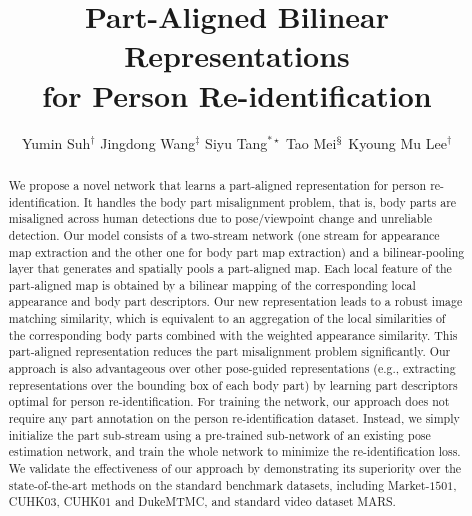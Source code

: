 \documentclass{llncs}
\begin{document}
\pagestyle{headings}
\mainmatter
\def\ECCV18SubNumber{****}  

\title{Part-Aligned Bilinear Representations \\for Person Re-identification}

\author{Yumin Suh$^\dagger$ \quad Jingdong Wang$^\ddagger$ \quad Siyu Tang$^{\ast \star}$ \quad Tao Mei$^\mathsection$ \quad Kyoung Mu Lee$^\dagger$}

\maketitle

\begin{abstract}
We propose a novel network that learns a part-aligned representation for person re-identification. It handles the body part misalignment problem, that is, body parts are misaligned across human detections due to pose/viewpoint change and unreliable detection. Our model consists of a two-stream network (one stream for appearance map extraction and the other one for body part map extraction) and a bilinear-pooling layer that generates and spatially pools a part-aligned map. Each local feature of the part-aligned map is obtained by a bilinear mapping of the corresponding local appearance and body part descriptors. Our new representation leads to a robust image matching similarity, which is equivalent to an aggregation of the local similarities of the corresponding body parts combined with the weighted appearance similarity. This part-aligned representation reduces the part misalignment problem significantly. Our approach is also advantageous over other pose-guided representations (e.g., extracting representations over the bounding box of each body part) by learning part descriptors optimal for person re-identification. For training the network, our approach does not require any part annotation on the person re-identification dataset. Instead, we simply initialize the part sub-stream using a pre-trained sub-network of an existing pose estimation network, and train the whole network to minimize the re-identification loss. We validate the effectiveness of our approach by demonstrating its superiority over the state-of-the-art methods on the standard benchmark datasets, including Market-$1501$, CUHK$03$, CUHK$01$ and DukeMTMC, and standard video dataset MARS.
\end{abstract}
\end{document}
